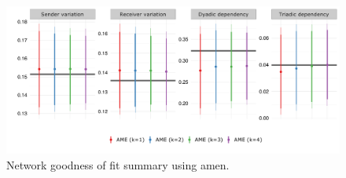 \documentclass[12pt,pdflatex]{elsarticle}
\newcommand{\pkg}[1]{{\fontseries{b}\selectfont #1}}
\begin{document}
\begin{figure}[ht]
	\centering
	\includegraphics[width=1\textwidth]{netPerfCoef_ameSR}
	\caption{Network goodness of fit summary using \pkg{amen}.}
	\label{fig:netPerfCoef_ameSR}
\end{figure}


\clearpage
% 

% 
\newpage
\end{document}
